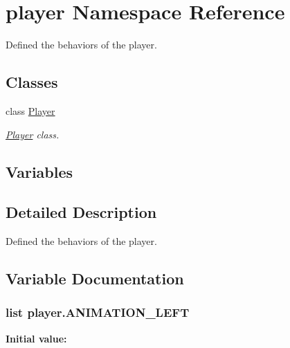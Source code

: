 \hypertarget{namespaceplayer}{}\section{player Namespace Reference}
\label{namespaceplayer}


Defined the behaviors of the player.  


\subsection*{Classes}
\begin{DoxyCompactItemize}
\item 
class \hyperlink{classplayer_1_1_player}{Player}
\begin{DoxyCompactList}\small\item\em \hyperlink{classplayer_1_1_player}{Player} class. \end{DoxyCompactList}\end{DoxyCompactItemize}
\subsection*{Variables}
\begin{DoxyCompactItemize}
\end{DoxyCompactItemize}


\subsection{Detailed Description}
Defined the behaviors of the player. 

\subsection{Variable Documentation}
\subsubsection[{\texorpdfstring{A\+N\+I\+M\+A\+T\+I\+O\+N\+\_\+\+L\+E\+FT}{ANIMATION_LEFT}}]{\setlength{\rightskip}{0pt plus 5cm}list player.\+A\+N\+I\+M\+A\+T\+I\+O\+N\+\_\+\+L\+E\+FT}\hypertarget{namespaceplayer_ae86d8b914785e2c3229383c956d87836}{}\label{namespaceplayer_ae86d8b914785e2c3229383c956d87836}
{\bfseries Initial value\+:}
